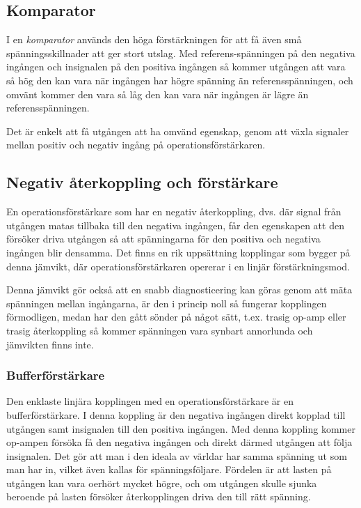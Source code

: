 \subsection{Komparator}

I en \emph{komparator} används den höga förstärkningen för att få även små
spänningsskillnader att ger stort utslag. Med referens-spänningen på den
negativa ingången och insignalen på den positiva ingången så kommer utgången
att vara så hög den kan vara när ingången har högre spänning än
referensspänningen, och omvänt kommer den vara så låg den kan vara när ingången
är lägre än referensspänningen.

Det är enkelt att få utgången att ha omvänd egenskap, genom att växla signaler
mellan positiv och negativ ingång på operationsförstärkaren.

\subsection{Negativ återkoppling och förstärkare}

En operationsförstärkare som har en negativ återkoppling, dvs. där signal från
utgången matas tillbaka till den negativa ingången, får den egenskapen att den
försöker driva utgången så att spänningarna för den positiva och negativa
ingången blir densamma.
Det finns en rik uppsättning kopplingar som bygger på denna jämvikt, där
operationsförstärkaren opererar i en linjär förstärkningsmod.

Denna jämvikt gör också att en snabb diagnosticering kan göras genom att mäta
spänningen mellan ingångarna, är den i princip noll så fungerar kopplingen
förmodligen, medan har den gått sönder på något sätt, t.ex. trasig op-amp
eller trasig återkoppling så kommer spänningen vara synbart annorlunda och
jämvikten finns inte.

\subsubsection{Bufferförstärkare}

Den enklaste linjära kopplingen med en operationsförstärkare är en
bufferförstärkare.
I denna koppling är den negativa ingången direkt kopplad till utgången
samt insignalen till den positiva ingången.
Med denna koppling kommer op-ampen försöka få den negativa ingången och direkt
därmed utgången att följa insignalen.
Det gör att man i den ideala av världar har samma spänning ut som man har in,
vilket även kallas för spänningsföljare.
Fördelen är att lasten på utgången kan vara oerhört mycket högre, och
om utgången skulle sjunka beroende på lasten försöker återkopplingen driva den
till rätt spänning.

